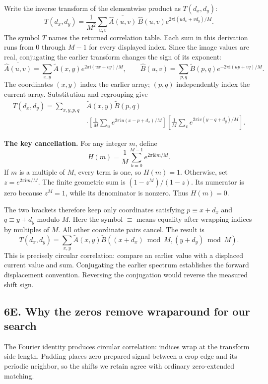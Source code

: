 \documentclass[11pt,letterpaper]{article}
\begin{document}
Write the inverse transform of the elementwise product as $T(d_x,d_y)$:
\[
T(d_x,d_y)=\frac{1}{M^2}\sum_{u,v}
\overline{\widehat A(u,v)}\,\widehat B(u,v)
e^{2\pi\mathrm{i}(ud_x+vd_y)/M}.
\]
The symbol $T$ names the returned correlation table. Each sum in this derivation runs from 0 through $M-1$ for every displayed index. Since the image values are real, conjugating the earlier transform changes the sign of its exponent:
\[
\overline{\widehat A(u,v)}=\sum_{x,y}\widetilde A(x,y)e^{2\pi\mathrm{i}(ux+vy)/M},
\qquad
\widehat B(u,v)=\sum_{p,q}\widetilde B(p,q)e^{-2\pi\mathrm{i}(up+vq)/M}.
\]
The coordinates $(x,y)$ index the earlier array; $(p,q)$ independently index the current array. Substitution and regrouping give
\begin{align*}
T(d_x,d_y)=\sum_{x,y,p,q}&\widetilde A(x,y)\widetilde B(p,q)\\[-2pt]
&\cdot\left[\frac1M\sum_u e^{2\pi\mathrm{i}u(x-p+d_x)/M}\right]
\left[\frac1M\sum_v e^{2\pi\mathrm{i}v(y-q+d_y)/M}\right].
\end{align*}

\textbf{The key cancellation.} For any integer $m$, define
\[
H(m)=\frac1M\sum_{k=0}^{M-1}e^{2\pi\mathrm{i}km/M}.
\]
If $m$ is a multiple of $M$, every term is one, so $H(m)=1$. Otherwise, set $z=e^{2\pi\mathrm{i}m/M}$. The finite geometric sum is $(1-z^M)/(1-z)$. Its numerator is zero because $z^M=1$, while its denominator is nonzero. Thus $H(m)=0$.

The two brackets therefore keep only coordinates satisfying $p\equiv x+d_x$ and $q\equiv y+d_y$ modulo $M$. Here the symbol $\equiv$ means equality after wrapping indices by multiples of $M$. All other coordinate pairs cancel. The result is
\begin{equation}
\boxed{T(d_x,d_y)=\sum_{x,y}\widetilde A(x,y)
\widetilde B((x+d_x)\bmod M,(y+d_y)\bmod M).}
\end{equation}
This is precisely circular correlation: compare an earlier value with a displaced current value and sum. Conjugating the earlier spectrum establishes the forward displacement convention. Reversing the conjugation would reverse the measured shift sign.

\clearpage
\subsection*{6E. Why the zeros remove wraparound for our search}
The Fourier identity produces circular correlation: indices wrap at the transform side length. Padding places zero prepared signal between a crop edge and its periodic neighbor, so the shifts we retain agree with ordinary zero-extended matching.
\end{document}
